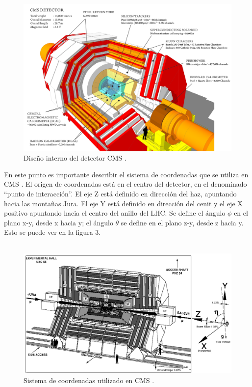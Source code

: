 \\
\\
\begin{figure}
\centering
\includegraphics[width=15cm]{F2.png}
\caption{\label{fig:frog} Diseño interno del detector CMS \cite{Bayatian:2006nff}.}
\end{figure}
En este punto es importante describir el sistema de coordenadas que se utiliza en CMS \cite{RuizAlvarez:2016mhn}. El origen de coordenadas está en el centro del detector, en el denominado ``punto de interacción''. El eje Z está definido en dirección del haz, apuntando hacia las montañas Jura. El eje Y está definido en dirección del cenit y el eje X positivo apuntando hacia el centro del anillo del LHC. Se define el ángulo $\phi$ en el plano x-y, desde x hacia y; el ángulo $\theta$ se define en el plano z-y, desde z hacia y. Esto se puede ver en la figura 3.
\\
\\
\begin{figure}
	\centering
	\includegraphics[width=15cm]{F5.png}
	\caption{\label{fig:frog} Sistema de coordenadas utilizado en CMS \cite{RuizAlvarez:2016mhn}.}
\end{figure}
